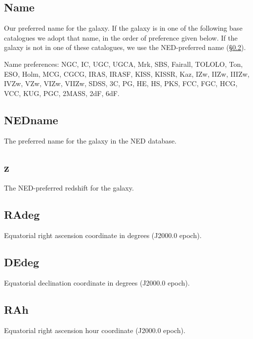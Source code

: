 \subsection{Name} \label{Name}
Our preferred name for the galaxy. If the galaxy is in one of the following base catalogues we adopt that name, in the order of preference given below. If the galaxy is not in one of these catalogues, we use the NED-preferred name (\S \ref{NEDname}).

Name preferences: NGC, IC, UGC, UGCA, Mrk, SBS, Fairall, TOLOLO, Ton, ESO, Holm, MCG, CGCG, IRAS, IRASF, KISS, KISSR, Kaz, IZw, IIZw, IIIZw, IVZw, VZw, VIZw, VIIZw, SDSS, 3C, PG, HE, HS, PKS, FCC, FGC, HCG, VCC, KUG, PGC, 2MASS, 2dF, 6dF.



\subsection{NEDname} \label{NEDname}
The preferred name for the galaxy in the NED database.

\subsection{z} \label{z}
The NED-preferred redshift for the galaxy. 

\subsection{RAdeg} \label{RAdeg}
Equatorial right ascension coordinate in degrees (J2000.0 epoch).

\subsection{DEdeg} \label{DEdeg}
Equatorial declination coordinate in degrees (J2000.0 epoch).

\subsection{RAh} \label{RAh}
Equatorial right ascension hour coordinate (J2000.0 epoch).

